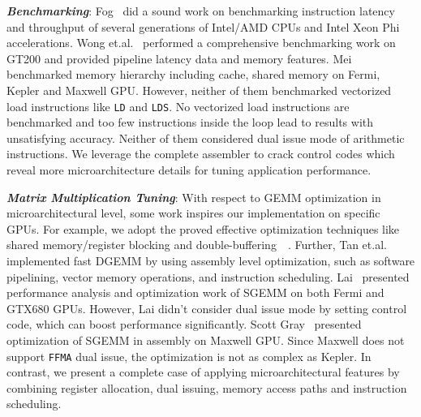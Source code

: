 {\em {\bf Benchmarking}}: 
Fog~\cite{fog} did a sound work on benchmarking instruction latency and throughput of several generations of Intel/AMD CPUs and Intel Xeon Phi accelerations. %
Wong et.al.~\cite{wong} performed a 
comprehensive benchmarking work on GT200 and provided pipeline latency data and
memory features. Mei~\cite{mei} benchmarked memory hierarchy including cache, shared memory on Fermi, Kepler and Maxwell GPU.
However, neither of them benchmarked 
vectorized load instructions like {\tt LD} and {\tt LDS}. 
No vectorized load instructions are benchmarked and too few instructions inside the loop lead to results with unsatisfying accuracy.
Neither of them considered dual issue mode of 
arithmetic instructions. We leverage the complete assembler to crack control codes which reveal more 
microarchitecture details for tuning application performance.

{\em {\bf Matrix Multiplication Tuning}}: With respect to GEMM optimization in microarchitectural level, some work inspires our implementation 
on specific GPUs. For example, we adopt the proved effective optimization techniques like shared memory/register 
blocking and double-buffering~\cite{volkov}~\cite{tan}. Further, Tan et.al.~\cite{tan} implemented fast DGEMM by using 
assembly level optimization, such as software pipelining, vector memory operations, and instruction scheduling. 
Lai~\cite{lai} presented performance analysis and optimization work of SGEMM on both Fermi and GTX680 GPUs. However, 
Lai didn't consider dual issue mode by setting control code, which can boost performance significantly. Scott 
Gray~\cite{nervana_sgemm_wiki} presented optimization of SGEMM in assembly on Maxwell GPU. Since Maxwell does not 
support {\tt FFMA} dual issue, the optimization is not as complex as 
Kepler. In contrast, we present a complete case of applying microarchitectural features by combining 
register allocation, dual issuing, memory access paths and instruction scheduling.
